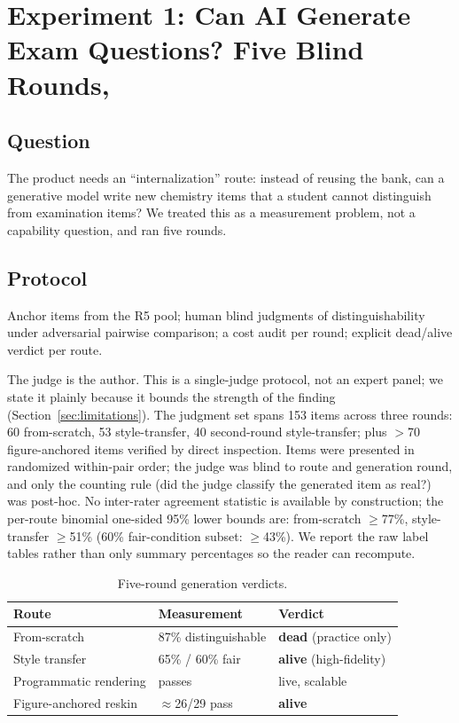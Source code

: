 \section{Experiment 1: Can AI Generate Exam Questions? Five Blind Rounds, }
\label{sec:exp1}

\subsection{Question}
The product needs an ``internalization'' route: instead of reusing the bank, can a generative model write new chemistry items that a student cannot distinguish from examination items? We treated this as a measurement problem, not a capability question, and ran five rounds.

\subsection{Protocol}
Anchor items from the R5 pool; human blind judgments of distinguishability under adversarial pairwise comparison; a cost audit per round; explicit dead/alive verdict per route.

The judge is the author. This is a single-judge protocol, not an expert panel; we state it plainly because it bounds the strength of the finding (Section~\ref{sec:limitations}). The judgment set spans 153 items across three rounds: 60 from-scratch, 53 style-transfer, 40 second-round style-transfer; plus $>$70 figure-anchored items verified by direct inspection. Items were presented in randomized within-pair order; the judge was blind to route and generation round, and only the counting rule (did the judge classify the generated item as real?) was post-hoc. No inter-rater agreement statistic is available by construction; the per-route binomial one-sided 95\% lower bounds are: from-scratch $\geq$77\%, style-transfer $\geq$51\% (60\% fair-condition subset: $\geq$43\%). We report the raw label tables rather than only summary percentages so the reader can recompute.

\begin{table}[h]
\centering
\small
\begin{tabular}{lll}
\toprule
\textbf{Route} & \textbf{Measurement} & \textbf{Verdict} \\
\midrule
From-scratch & 87\% distinguishable & \textbf{dead} (practice only) \\
Style transfer & 65\% / 60\% fair & \textbf{alive} (high-fidelity) \\
Programmatic rendering & passes & live, scalable \\
Figure-anchored reskin & $\approx$26/29 pass & \textbf{alive} \\
\bottomrule
\end{tabular}
\caption{Five-round generation verdicts.}
\label{tab:exp1}
\end{table}

